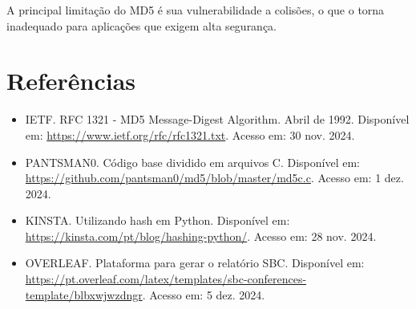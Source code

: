 \documentclass{article}
\begin{document}
A principal limitação do MD5 é sua vulnerabilidade a colisões, o que o torna inadequado para aplicações que exigem alta segurança.

\section*{Referências}

\begin{itemize}
    \item IETF. RFC 1321 - MD5 Message-Digest Algorithm. Abril de 1992. Disponível em: \url{https://www.ietf.org/rfc/rfc1321.txt}. Acesso em: 30 nov. 2024.
    \item PANTSMAN0. Código base dividido em arquivos C. Disponível em: \url{https://github.com/pantsman0/md5/blob/master/md5c.c}. Acesso em: 1 dez. 2024.
    \item KINSTA. Utilizando hash em Python. Disponível em: \url{https://kinsta.com/pt/blog/hashing-python/}. Acesso em: 28 nov. 2024.
    \item OVERLEAF. Plataforma para gerar o relatório SBC. Disponível em: \url{https://pt.overleaf.com/latex/templates/sbc-conferences-template/blbxwjwzdngr}. Acesso em: 5 dez. 2024.
\end{itemize}
\end{document}

